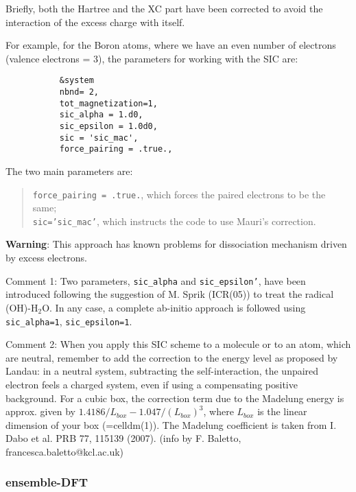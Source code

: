 \documentclass[12pt,a4paper]{article}
\begin{document}
Briefly, both the Hartree and the XC part have been 
corrected to avoid the interaction of the excess charge with itself.

For example, for the Boron atoms, where we have an even number of 
electrons (valence electrons = 3), the parameters for working with
the SIC are:
\begin{verbatim}
           &system
           nbnd= 2,
           tot_magnetization=1,
           sic_alpha = 1.d0,
           sic_epsilon = 1.0d0,
           sic = 'sic_mac',
           force_pairing = .true.,
\end{verbatim}
The two main parameters are:
\begin{quote}
\texttt{force\_pairing = .true.}, which forces the paired electrons to be the same;\\ 
\texttt{sic='sic\_mac'}, which instructs the code to use Mauri's correction.
\end{quote}

{\bf Warning}: 
This approach has known problems for dissociation mechanism
driven by excess electrons.

Comment 1:
Two parameters, \texttt{sic\_alpha} and \texttt{sic\_epsilon'}, have been introduced 
following the suggestion of M. Sprik (ICR(05)) to treat the radical
(OH)-H$_2$O. In any case, a complete ab-initio approach is followed 
using \texttt{sic\_alpha=1}, \texttt{sic\_epsilon=1}.

Comment 2:
When you apply this SIC scheme to a molecule or to an atom, which are neutral,
remember to add the correction to the energy level as proposed by Landau: 
in a neutral system, subtracting the self-interaction, the unpaired electron
feels a charged system, even if using a compensating positive background. 
For a cubic box, the correction term due to the Madelung energy is approx. 
given by $1.4186/L_{box} - 1.047/(L_{box})^3$, where $L_{box}$ is the 
linear dimension of your box (=celldm(1)). The Madelung coefficient is 
taken from I. Dabo et al. PRB 77, 115139 (2007).
(info by F. Baletto, francesca.baletto@kcl.ac.uk)



\subsubsection{ ensemble-DFT }
\end{document}
